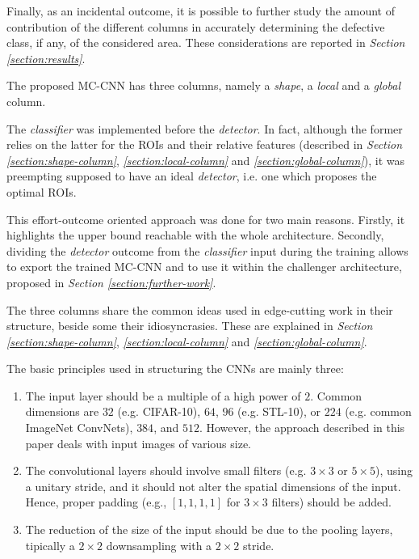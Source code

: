     \par{
        Finally, as an incidental outcome, it is possible to further study the amount of contribution of the different columns in accurately determining the defective class, if any, of the considered area. These considerations are reported in \emph{Section \ref{section:results}}.
    }
    \par{
        The proposed MC-CNN has three columns, namely a \emph{shape}, a \emph{local} and a \emph{global} column.
    }
    \par{
        The \emph{classifier} was implemented before the \emph{detector}. In fact, although the former relies on the latter for the ROIs and their relative features (described in \emph{Section \ref{section:shape-column}}, \emph{\ref{section:local-column}} and \emph{\ref{section:global-column}}), it was preempting supposed to have an ideal \emph{detector}, i.e. one which proposes the optimal ROIs.
    }
    \par{
        This effort-outcome oriented approach was done for two main reasons. Firstly, it highlights the upper bound reachable with the whole architecture. Secondly, dividing the \emph{detector} outcome from the \emph{classifier} input during the training allows to export the trained MC-CNN and to use it within the challenger architecture, proposed in \emph{Section \ref{section:further-work}}.
    }
    \par{
        The three columns share the common ideas used in edge-cutting work \cite{stanford:cs231n} in their structure, beside some their idiosyncrasies. These are explained in \emph{Section \ref{section:shape-column}}, \emph{\ref{section:local-column}} and \emph{\ref{section:global-column}}.
    }
    \par{
        The basic principles used in structuring the CNNs are mainly three:
        \begin{enumerate}
            \item The input layer should be a multiple of a high power of $2$. Common dimensions are $32$ (e.g. CIFAR-10), $64$, $96$ (e.g. STL-10), or $224$ (e.g. common ImageNet ConvNets), $384$, and $512$. However, the approach described in this paper deals with input images of various size.
            \item The convolutional layers should involve small filters (e.g. $3\times 3$ or $5\times5$), using a unitary stride, and it should not alter the spatial dimensions of the input. Hence, proper padding (e.g., $\left[1,1,1,1\right]$ for $3\times 3$ filters) should be added.
            \item The reduction of the size of the input should be due to the pooling layers, tipically a $2\times 2$ downsampling with a $2\times 2$ stride.
        \end{enumerate}
    }
